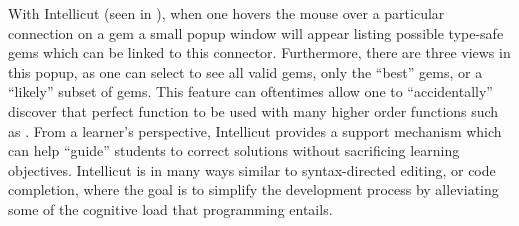 With Intellicut (seen in ), when one hovers the mouse over a particular connection on a gem a small popup window will appear listing possible type-safe gems which can be linked to this connector.  Furthermore, there are three views in this popup, as one can select to see all valid gems, only the ``best'' gems, or a ``likely'' subset of gems.  This feature can oftentimes allow one to ``accidentally'' discover that perfect function to be used with many higher order functions such as .  From a learner's perspective, Intellicut provides a support mechanism which can help ``guide'' students to correct solutions without sacrificing learning objectives.  Intellicut is in many ways similar to syntax-directed editing, or code completion, where the goal is to simplify the development process by alleviating some of the cognitive load that programming entails.


